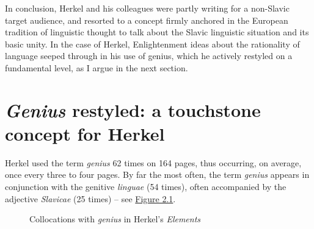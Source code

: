 In conclusion, Herkel and his colleagues were partly writing for a non-Slavic target audience, and resorted to a concept firmly anchored in the European tradition of linguistic thought to talk about the Slavic linguistic situation and its basic unity. In the case of Herkel, Enlightenment ideas about the rationality of language seeped through in his use of genius, which he actively restyled on a fundamental level, as I argue in the next section.

\section{\textit{Genius} restyled: a touchstone concept for Herkel}
\label{sec:Genius restyled}

Herkel used the term \textit{genius} 62 times on 164 pages, thus occurring, on average, once every three to four pages. By far the most often, the term \textit{genius} appears in conjunction with the genitive \textit{linguae} (54 times), often accompanied by the adjective \textit{Slavicae} (25 times) – see \hyperref[fig:Figure 2.1]{Figure 2.1}.

\begin{figure}
    \caption{Collocations with \textit{genius} in Herkel’s \textit{Elements}}
    \label{fig:Figure 2.1}
\end{figure}




